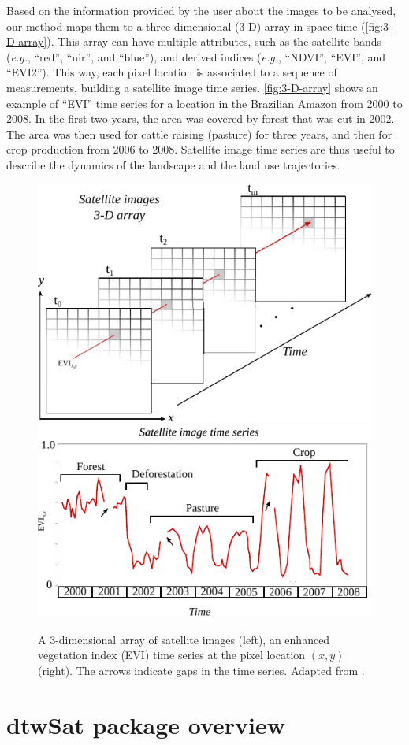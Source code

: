 \documentclass[article,shortnames]{jss}
\begin{document}
Based on the information provided by the user about the images to be
analysed, our method maps them to a three-dimensional (3-D) array in
space-time (\autoref{fig:3-D-array}). This array can have multiple
attributes, such as the satellite bands (\emph{e.g.}, ``red'', ``nir'',
and ``blue''), and derived indices (\emph{e.g.}, ``NDVI'', ``EVI'', and
``EVI2''). This way, each pixel location is associated to a sequence of
measurements, building a satellite image time series.
\autoref{fig:3-D-array} shows an example of ``EVI'' time series for a
location in the Brazilian Amazon from 2000 to 2008. In the first two
years, the area was covered by forest that was cut in 2002. The area was
then used for cattle raising (pasture) for three years, and then for
crop production from 2006 to 2008. Satellite image time series are thus
useful to describe the dynamics of the landscape and the land use
trajectories.

\begin{figure}[!h]
\begin{center} 
  \includegraphics[width=.45\textwidth]{./images_array.pdf}
  \includegraphics[width=.45\textwidth]{./images_ts.pdf}
\end{center}
\caption{A 3-dimensional array of satellite images (left), an enhanced vegetation index (EVI) time series at the pixel location $(x,y)$ (right). The arrows indicate gaps in the time series. Adapted from \citet{Maus:2016}.}
\label{fig:3-D-array}
\end{figure}

\section{dtwSat package overview}\label{dtwsat-package-overview}
\end{document}
